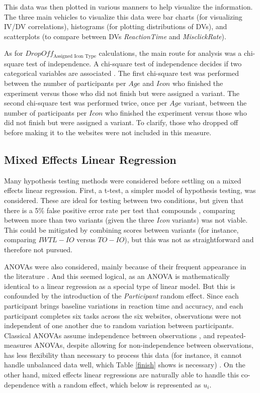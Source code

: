 \documentclass[12pt,twoside]{reedthesis}
\begin{document}
        This data was then plotted in various manners to help visualize the information. The three main vehicles to visualize this data were bar charts (for visualizing IV/DV correlations), histograms (for plotting distributions of DVs), and scatterplots (to compare between DVs \textit{ReactionTime} and \textit{MisclickRate}). 

        As for $DropOff_{\text{Assigned Icon Type}}$ calculations, the main route for analysis was a chi-square test of independence. A chi-square test of independence decides if two categorical variables are associated \cite{discovery_chi-square}. The first chi-square test was performed between the number of participants per $Age$ and $Icon$ who finished the experiment versus those who did not finish but were assigned a variant. The second chi-square test was performed twice, once per $Age$ variant, between the number of participants per $Icon$ who finished the experiment versus those who did not finish but were assigned a variant. To clarify, those who dropped off before making it to the websites were not included in this measure. 

    \subsection{Mixed Effects Linear Regression} \label{3.3.4}

    Many hypothesis testing methods were considered before settling on a mixed effects linear regression. First, a t-test, a simpler model of hypothesis testing, was considered. These are ideal for testing between two conditions, but given that there is a 5\% false positive error rate per test that compounds \cite{one-way}, comparing between more than two variants (given the three \textit{Icon} variants) was not viable. This could be mitigated by combining scores between variants (for instance, comparing $IWTL - IO$ versus $TO - IO$), but this was not as straightforward and therefore not pursued.

    ANOVAs were also considered, mainly because of their frequent appearance in the literature \cite{ganor_designing_nodate, schroder_effects_2008, liu_study_2023, dosso_how_2021, wu_how_2022, xi_influence_2018, song_developing_2024, grahame_age_2004, yu_reducing_2024}. And this seemed logical, as an ANOVA is mathematically identical to a linear regression as a special type of linear model. But this is confounded by the introduction of the \textit{Participant} random effect. Since each participant brings baseline variations in reaction time and accuracy, and each participant completes six tasks across the six websites, observations were not independent of one another due to random variation between participants. Classical ANOVAs assume independence between observations \cite{one_way_anova}, and repeated-measures ANOVAs, despite allowing for non-independence between observations, has less flexibility than necessary to process this data (for instance, it cannot handle unbalanced data well, which Table \ref{finish} shows is necessary) \cite{muhammad_guidelines_nodate}. On the other hand, mixed effects linear regressions are naturally able to handle this co-dependence with a random effect, which below is represented as $u_i$.
\end{document}
